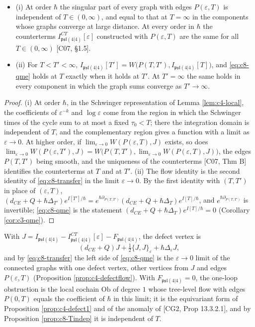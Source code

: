 \begin{proposition}
\label{prop:c8-Tindep}
\begin{itemize}
\item (i) At order $\hbar$ the singular part of every graph with edges $P(\varepsilon,T)$ is independent of $T\in(0,\infty)$, and equal to that at $T=\infty$ in the components whose graphs converge at large distance. At every order in $\hbar$ the counterterms $I^{CT}_{\mathfrak{psl}(4|4)}[\varepsilon]$ constructed with $P(\varepsilon,T)$ are the same for all $T\in(0,\infty)$ [C07, §1.5].
\item (ii) For $T<T'<\infty$, $I_{\mathfrak{psl}(4|4)}[T']=W\big(P(T,T'),I_{\mathfrak{psl}(4|4)}[T]\big)$, and \eqref{eq:c8-qme} holds at $T$ exactly when it holds at $T'$. At $T'=\infty$ the same holds in every component in which the graph sums converge as $T'\to\infty$.
\end{itemize}
\end{proposition}

\begin{proof}
(i) At order $\hbar$, in the Schwinger representation of Lemma \ref{lem:c4-local}, the coefficients of $\varepsilon^{-k}$ and $\log\varepsilon$ come from the region in which the Schwinger times of the cycle sum to at most a fixed $\tau_0<T$; there the integration domain is independent of $T$, and the complementary region gives a function with a limit as $\varepsilon\to0$. At higher order, if $\lim_{\varepsilon\to0}W(P(\varepsilon,T),J)$ exists, so does $\lim_{\varepsilon\to0}W(P(\varepsilon,T'),J)=W\big(P(T,T'),\lim_{\varepsilon\to0}W(P(\varepsilon,T),J)\big)$, the edges $P(T,T')$ being smooth, and the uniqueness of the counterterms [C07, Thm B] identifies the counterterms at $T$ and at $T'$. (ii) The flow identity is the second identity of \eqref{eq:c8-transfer} in the limit $\varepsilon\to0$. By the first identity with $(T,T')$ in place of $(\varepsilon,T)$, $(d_{CE}+Q+\hbar\Delta_{T'})e^{I[T']/\hbar}=e^{\hbar\partial_{P(T,T')}}(d_{CE}+Q+\hbar\Delta_T)e^{I[T]/\hbar}$, and $e^{\hbar\partial_{P(T,T')}}$ is invertible; \eqref{eq:c8-qme} is the statement $(d_{CE}+Q+\hbar\Delta_T)e^{I[T]/\hbar}=0$ (Corollary \ref{cor:c3-qme}).
\end{proof}

\begin{definition}
\label{def:c8-ob}
With $J=I_{\mathfrak{psl}(4|4)}-I^{CT}_{\mathfrak{psl}(4|4)}[\varepsilon]-F_{\mathfrak{psl}(4|4)}$, the defect vertex is
\[
(d_{CE}+Q)J+\tfrac12\{J,J\}_\varepsilon+\hbar\Delta_\varepsilon J ,
\]
and by \eqref{eq:c8-transfer} the left side of \eqref{eq:c8-qme} is the $\varepsilon\to0$ limit of the connected graphs with one defect vertex, other vertices from $J$ and edges $P(\varepsilon,T)$ (Proposition \ref{prop:c4-defectflow}). With $F_{\mathfrak{psl}(4|4)}=0$, the one-loop obstruction is the local cochain $\mathrm{Ob}$ of degree $1$ whose tree-level flow with edges $P(0,T)$ equals the coefficient of $\hbar$ in this limit; it is the equivariant form of Proposition \ref{prop:c4-defect1} and of the anomaly of [CG2, Prop 13.3.2.1], and by Proposition \ref{prop:c8-Tindep} it is independent of $T$.
\end{definition}

